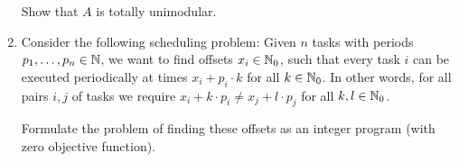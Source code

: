 \begin{enumerate}
Show that $A$ is totally unimodular.
\label{i:item:7}


\item 
  Consider the following scheduling problem: Given $n$ tasks with
  periods $p_1, \ldots, p_n\in \mathbb{N}$, we want to find offsets $x_i\in \mathbb{N}_0$,
  such that every task $i$ can be executed periodically at times $x_i
  + p_i \cdot k$ for all $k\in \mathbb{N}_0$.  In other words, for all pairs $i,j$
  of tasks we require $x_i+k\cdot p_i \neq x_j +l\cdot p_j$ for all
  $k,l\in\mathbb{N}_0$.

  Formulate the problem of finding these offsets as an integer program
  (with zero objective function).
\label{i:item:8}



\end{enumerate}
